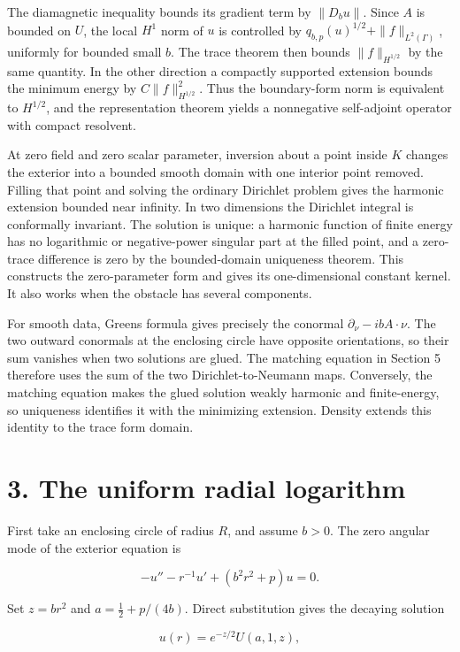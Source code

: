 \documentclass[11pt]{article}
\begin{document}
The diamagnetic inequality bounds its gradient term by \(\|D_bu\|\).
Since \(A\) is bounded on \(U\), the local \(H^1\) norm of \(u\) is
controlled by \(q_{b,p}(u)^{1/2}+\|f\|_{L^2(\Gamma)}\), uniformly for
bounded small \(b\). The trace theorem then bounds \(\|f\|_{H^{1/2}}\)
by the same quantity. In the other direction a compactly supported
extension bounds the minimum energy by \(C\|f\|_{H^{1/2}}^2\). Thus the
boundary-form norm is equivalent to \(H^{1/2}\), and the representation
theorem yields a nonnegative self-adjoint operator with compact
resolvent.

At zero field and zero scalar parameter, inversion about a point inside
\(K\) changes the exterior into a bounded smooth domain with one
interior point removed. Filling that point and solving the ordinary
Dirichlet problem gives the harmonic extension bounded near infinity. In
two dimensions the Dirichlet integral is conformally invariant. The
solution is unique: a harmonic function of finite energy has no
logarithmic or negative-power singular part at the filled point, and a
zero-trace difference is zero by the bounded-domain uniqueness theorem.
This constructs the zero-parameter form and gives its one-dimensional
constant kernel. It also works when the obstacle has several components.

For smooth data, Green\textquotesingle s formula gives precisely the
conormal \(\partial_\nu-ibA\cdot\nu\). The two outward conormals at the
enclosing circle have opposite orientations, so their sum vanishes when
two solutions are glued. The matching equation in Section 5 therefore
uses the sum of the two Dirichlet-to-Neumann maps. Conversely, the
matching equation makes the glued solution weakly harmonic and
finite-energy, so uniqueness identifies it with the minimizing
extension. Density extends this identity to the trace form domain.

\section{3. The uniform radial
logarithm}\label{the-uniform-radial-logarithm}

First take an enclosing circle of radius \(R\), and assume \(b>0\). The
zero angular mode of the exterior equation is

\[-u''-r^{-1}u'+(b^2r^2+p)u=0.\]

Set \(z=br^2\) and \(a=\tfrac12+p/(4b)\). Direct substitution gives the
decaying solution

\[u(r)=e^{-z/2}U(a,1,z),\]
\end{document}
